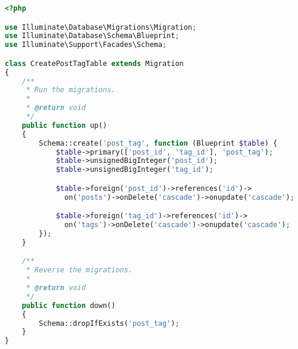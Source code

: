 \documentclass[11pt, oneside]{article}   	%
\begin{document}
\begin{lstlisting}[showstringspaces=false, title=CreatePostTagTable.java, language=PHP, frame=single]
<?php

use Illuminate\Database\Migrations\Migration;
use Illuminate\Database\Schema\Blueprint;
use Illuminate\Support\Facades\Schema;

class CreatePostTagTable extends Migration
{
    /**
     * Run the migrations.
     *
     * @return void
     */
    public function up()
    {
        Schema::create('post_tag', function (Blueprint $table) {
            $table->primary(['post_id', 'tag_id'], 'post_tag');
            $table->unsignedBigInteger('post_id');
            $table->unsignedBigInteger('tag_id');

            $table->foreign('post_id')->references('id')->
              on('posts')->onDelete('cascade')->onupdate('cascade');

            $table->foreign('tag_id')->references('id')->
              on('tags')->onDelete('cascade')->onupdate('cascade');
        });
    }

    /**
     * Reverse the migrations.
     *
     * @return void
     */
    public function down()
    {
        Schema::dropIfExists('post_tag');
    }
}
\end{lstlisting}

\section{}
\end{document}
